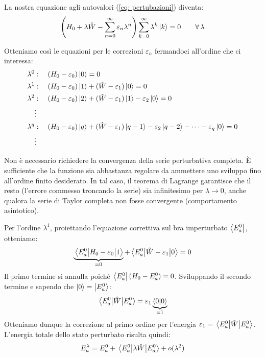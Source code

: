 La nostra equazione agli autovalori (\ref{eq: pertubazioni}) diventa:
\begin{equation}
    \left(H_0+ \lambda\hat{W}- \sum_{n=0}^{\infty}\varepsilon_n\lambda^n\right)\sum_{k=0}^{\infty}\lambda^k\ket{k}=0 \qquad \forall \,\lambda
\end{equation}

Otteniamo così le equazioni per le correzioni \(\varepsilon_n\) fermandoci all'ordine che ci interessa:
\begin{align*}
    \lambda^0 &: \quad (H_0 - \varepsilon_0) \ket{0} = 0 \\
    \lambda^1 &: \quad (H_0 - \varepsilon_0) \ket{1} + (\hat{W} - \varepsilon_1) \ket{0} = 0 \\
    \lambda^2 &: \quad (H_0 - \varepsilon_0) \ket{2} + (\hat{W} - \varepsilon_1) \ket{1} - \varepsilon_2 \ket{0} = 0 \\
    &\vdots \\
    \lambda^q &: \quad (H_0 - \varepsilon_0) \ket{q} + (\hat{W} - \varepsilon_1) \ket{q-1} - \varepsilon_2 \ket{q-2} - \dots - \varepsilon_q \ket{0} = 0 \\
    &\vdots
\end{align*}



\begin{remark}
    Non è necessario richiedere la convergenza della serie perturbativa completa. 
    È sufficiente che la funzione sia abbastanza regolare da ammettere uno sviluppo fino all'ordine finito desiderato. 
    In tal caso, il teorema di Lagrange garantisce che il resto (l'errore commesso troncando la serie) sia infinitesimo per \(\lambda \to 0\), 
    anche qualora la serie di Taylor completa non fosse convergente (comportamento asintotico).
\end{remark}

Per l'ordine \(\lambda^1\), proiettando l'equazione correttiva sul bra imperturbato \(\bra{E_a^0}\), otteniamo:
\[
    \underbrace{\mel{E_a^0}{H_0 - \varepsilon_0}{1}}_{=0} + \mel{E_a^0}{\hat{W} - \varepsilon_1}{0} = 0
\]
Il primo termine si annulla poiché \(\bra{E_a^0}(H_0 - E_a^0) = 0\). Sviluppando il secondo termine e sapendo che \(\ket{0}=\ket{E_a^0}\):
\[
    \mel{E_a^0}{\hat{W}}{E_a^0} = \varepsilon_1 \underbrace{\braket{0}{0}}_{=1}
\]
Otteniamo dunque la correzione al primo ordine per l'energia \(\varepsilon_1 = \mel{E_a^0}{\hat{W}}{E_a^0}\).
L'energia totale dello stato perturbato risulta quindi:
\[
    E_a^\lambda = E_a^0 + \mel{E_a^0}{\lambda \hat{W}}{E_a^0} + o(\lambda^2)
\]

